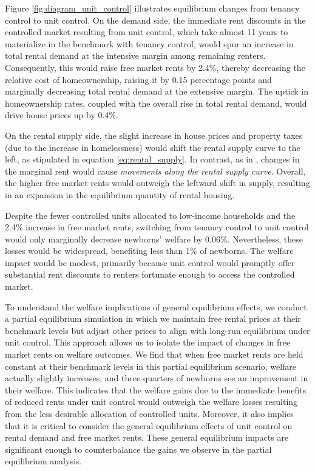 \documentclass[parskip=full]{article}
\begin{document}
Figure \ref{fig:diagram_unit_control} illustrates equilibrium changes from tenancy control to unit control. On the demand side, the immediate rent discounts in the controlled market resulting from unit control, which take almost 11 years to materialize in the benchmark with tenancy control, would spur an increase in total rental demand at the intensive margin among remaining renters. Consequently, this would raise free market rents by 2.4\%, thereby decreasing the relative cost of homeownership, raising it by 0.15 percentage points and marginally decreasing total rental demand at the extensive margin. The uptick in homeownership rates, coupled with the overall rise in total rental demand, would drive house prices up by 0.4\%.

On the rental supply side, the slight increase in house prices and property taxes (due to the increase in homelessness) would shift the rental supply curve to the left, as stipulated in equation \eqref{eq:rental_supply}. In contrast, as in \citet{fallis-1985}, changes in the marginal rent would cause \textsl{movements along the rental supply curve}. Overall, the higher free market rents would outweigh the leftward shift in supply, resulting in an expansion in the equilibrium quantity of rental housing. 

Despite the fewer controlled units allocated to low-income households and the 2.4\% increase in free market rents, switching from tenancy control to unit control would only marginally decrease newborns' welfare by 0.06\%. Nevertheless, these losses would be widespread, benefiting less than 1\% of newborns. The welfare impact would be modest, primarily because unit control would promptly offer substantial rent discounts to renters fortunate enough to access the controlled market.

To understand the welfare implications of general equilibrium effects, we conduct a partial equilibrium simulation in which we maintain free rental prices at their benchmark levels but adjust other prices to align with long-run equilibrium under unit control. This approach allows us to isolate the impact of changes in free market rents on welfare outcomes. We find that when free market rents are held constant at their benchmark levels in this partial equilibrium scenario, welfare actually slightly increases, and three quarters of newborns see an improvement in their welfare. This indicates that the welfare gains due to the immediate benefits of reduced rents under unit control would outweigh the welfare losses resulting from the less desirable allocation of controlled units. Moreover, it also implies that it is critical to consider the general equilibrium effects of unit control on rental demand and free market rents. These general equilibrium impacts are significant enough to counterbalance the gains we observe in the partial equilibrium analysis.
\end{document}
